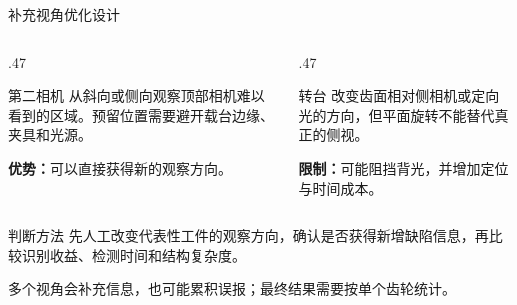 \documentclass[aspectratio=169,10pt]{beamer}
\begin{document}
\begin{frame}{补充视角优化设计}
  \begin{columns}[T,onlytextwidth]
    \begin{column}{.47\textwidth}
      \begin{block}{第二相机}
        从斜向或侧向观察顶部相机难以看到的区域。预留位置需要避开载台边缘、夹具和光源。
      \end{block}
      \textbf{优势：}可以直接获得新的观察方向。
    \end{column}
    \begin{column}{.47\textwidth}
      \begin{block}{转台}
        改变齿面相对侧相机或定向光的方向，但平面旋转不能替代真正的侧视。
      \end{block}
      \textbf{限制：}可能阻挡背光，并增加定位与时间成本。
    \end{column}
  \end{columns}

  \vspace{.75em}
  \begin{exampleblock}{判断方法}
    先人工改变代表性工件的观察方向，确认是否获得新增缺陷信息，再比较识别收益、检测时间和结构复杂度。
  \end{exampleblock}

  \vfill
  \small 多个视角会补充信息，也可能累积误报；最终结果需要按单个齿轮统计。
\end{frame}

\end{document}
